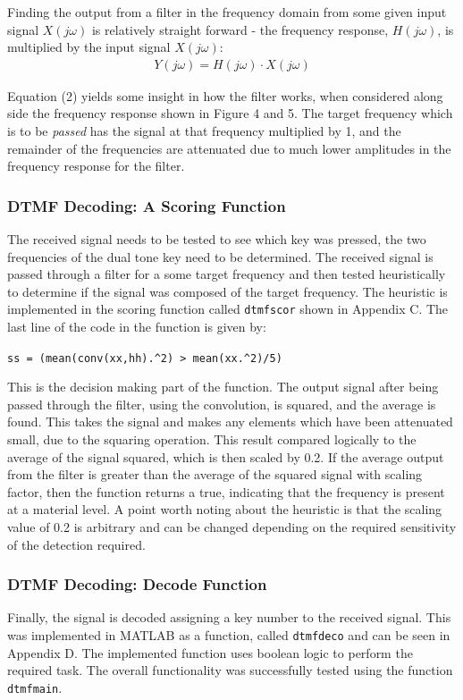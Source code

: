 \documentclass{article}
\begin{document}
Finding the output from a filter in the frequency domain from some given input signal $X(j \omega)$ is relatively straight forward - the frequency response, $H(j \omega)$, is multiplied by the input signal $X(j \omega)$:
\begin{align}
Y(j \omega) = H(j \omega) \cdot X(j \omega)
\end{align}

Equation (2) yields some insight in how the filter works, when considered along side the frequency response shown in Figure 4 and 5. The target frequency which is to be \textit{passed} has the signal at that frequency multiplied by 1, and the remainder of the frequencies are attenuated due to much lower amplitudes in the frequency response for the filter.

\subsubsection{DTMF Decoding: A Scoring Function}
The received signal needs to be tested to see which key was pressed, the two frequencies of the dual tone key need to be determined. The received signal is passed through a filter for a some target frequency and then tested heuristically to determine if the signal was composed of the target frequency. The heuristic is implemented in the scoring function called \verb|dtmfscor| shown in Appendix C. The last line of the code in the function is given by:
\begin{center}
	\verb|ss = (mean(conv(xx,hh).^2) > mean(xx.^2)/5)|
\end{center}

This is the decision making part of the function. The output signal after being passed through the filter, using the convolution, is squared, and the average is found. This takes the signal and makes any elements which have been attenuated small, due to the squaring operation. This result compared logically to the average of the signal squared, which is then scaled by 0.2. If the average output from the filter is greater than the average of the squared signal with scaling factor, then the function returns a true, indicating that the frequency is present at a material level. A point worth noting about the heuristic is that the scaling value of 0.2 is arbitrary and can be changed depending on the required sensitivity of the detection required.
 
\subsubsection{DTMF Decoding: Decode Function}
Finally, the signal is decoded assigning a key number to the received signal. This was implemented in MATLAB as a function, called \verb|dtmfdeco| and can be seen in Appendix D. The implemented function uses boolean logic to perform the required task. The overall functionality was successfully tested using the function \verb|dtmfmain|. 
\end{document}
